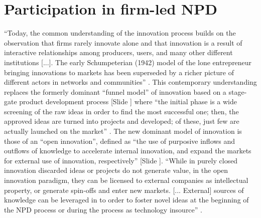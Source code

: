 \documentclass{article}
\newcounter{slide}
\begin{document}
\section{Participation in firm-led NPD}
\label{sec:OI}
``Today, the common understanding of the innovation process builds on the observation that firms rarely innovate alone and that innovation is a result of interactive relationships among producers, users, and many other different institutions [...]. The early Schumpeterian (1942) model of the lone entrepreneur bringing innovations
to markets has been superseded by a richer picture of different actors in networks and communities'' \cite{pillerSocialMediaSocial2011}. This contemporary understanding replaces the formerly dominant ``funnel model'' of innovation based on a stage-gate product development process {\color{blue}[Slide ]} where ``the initial phase is a wide screening of the raw ideas in order to find the most successful one; then, the approved ideas are turned into projects and developed; of these, just few are actually launched on the market'' \cite{colomboOpenInnovationMeets2016}. The new dominant model of innovation is those of an ``open innovation'', defined as ``the use of purposive inflows and outflows of knowledge to accelerate internal innovation, and expand the markets for external use of innovation, respectively'' \cite{chesbroughOpenInnovationNew2006}{\color{blue}[Slide ]}. ``While in purely closed innovation discarded ideas or projects do not generate value, in the open innovation paradigm, they can be licensed to external companies as intellectual property, or generate spin-offs and enter new markets. [... External] sources of knowledge can be leveraged in to order to foster novel ideas at the beginning of the NPD process or during the process as technology insource'' \cite{colomboOpenInnovationMeets2016}.
\end{document}
